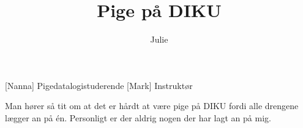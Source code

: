 \documentclass[a4paper,11pt]{article}
\title{Pige på DIKU}
\author{Julie}
\begin{document}
\maketitle

\begin{roles}
[Nanna] Pigedatalogistuderende
[Mark] Instruktør
\end{roles}

\begin{sketch}

 Man hører så tit om at det er hårdt at være pige på DIKU fordi alle
drengene lægger an på én. Personligt er der aldrig nogen der har lagt an på mig.

\end{sketch}
\end{document}
